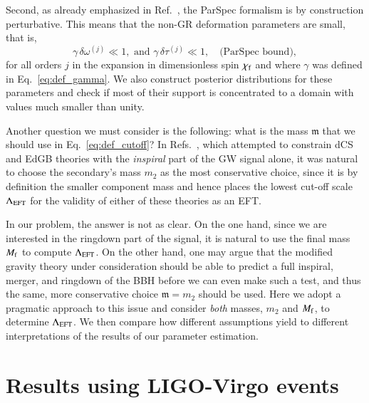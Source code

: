 \documentclass[twocolumn,
               prd,
               aps,
               superscriptaddress,
               tightenlines,
               nofootinbib,
               eqsecnum,
               amsfonts,
               amsmath,
               longbibliography]{revtex4-1}
\newcommand{\gm}{\mathfrak{m}}
\newcommand{\hs}[1]{{\textcolor{TealBlue}{{#1}}}}
\begin{document}
Second, as already emphasized in Ref.~\cite{Maselli:2019mjd}, the ParSpec
formalism is by construction perturbative. This means that the non-GR
deformation parameters are small, that is,
%
\begin{equation}
\gamma \, \delta \omega^{(j)} \ll 1,
\,\, \textrm{and} \,\,
\gamma \, \delta \tau^{(j)} \ll 1, \quad \textrm{(ParSpec bound)},
\label{eq:parspec_bound}
\end{equation}
%
for all orders $j$ in the expansion in dimensionless spin $\chi_{\rm f}$ and where $\gamma$
was defined in Eq.~\eqref{eq:def_gamma}.
%
We also construct posterior distributions for these parameters and check if
most of their support is concentrated to a domain with values much smaller than
unity.

Another question we must consider is the following: what is the mass $\mathfrak{m}$ that we should use
in Eq.~\eqref{eq:def_cutoff}?
%
In Refs.~\cite{Nair:2019iur,Perkins:2021mhb,Lyu:2022gdr}, which attempted to
constrain dCS and EdGB theories with the \emph{inspiral} part of
the GW signal alone, it was natural to choose the secondary's mass $m_2$ as the most
conservative choice, since it is by definition the smaller component mass and hence
places the lowest cut-off scale $\Lambda_{\rm EFT}$ for the validity of either of these theories as an EFT.

In our problem, the answer is not as clear. On the one hand, since we are
interested in the ringdown part of the signal, it is natural to use the
final mass $M_{\rm f}$ to compute $\Lambda_{\rm EFT}$.
%
On the other hand, one may argue that the modified gravity theory under
consideration should be able to predict a full inspiral, merger, and ringdown
of the BBH before we can even make such a test, and thus the
same, more conservative choice $\gm = m_2$ should be used.
%
Here we adopt a pragmatic approach to this issue and consider \emph{both}
masses, $m_2$ and $M_{\rm f}$, to determine $\Lambda_{\rm EFT}$.
%
We then compare how different assumptions yield to different
interpretations of the results of our parameter estimation.



\section{Results using LIGO-Virgo events}
\label{sec:results}

\end{document}
